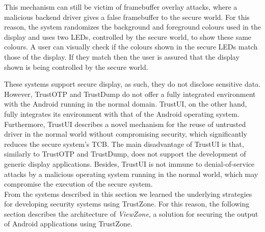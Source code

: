 This mechanism can still be victim of framebuffer overlay attacks, where a malicious backend driver gives a false framebuffer to the secure world. For this reason, the system randomizes the background and foreground colours used in the display and uses two LEDs, controlled by the secure world, to show these same colours. A user can visually check if the colours shown in the secure LEDs match those of the display. If they match then the user is assured that the display shown is being controlled by the secure world.

These systems support secure display, as such, they do not disclose sensitive data. However, TrustOTP and TrustDump do not offer a fully integrated environment with the Android running in the normal domain. TrustUI, on the other hand, fully integrates its environment with that of the Android operating system. Furthermore, TrustUI describes a novel mechanism for the reuse of untrusted driver in the normal world without compromising security, which significantly reduces the secure system's TCB. The main disadvantage of TrustUI is that, similarly to TrustOTP and TrustDump, does not support the development of generic display applications. Besides, TrustUI is not immune to denial-of-service attacks by a malicious operating system running in the normal world, which may compromise the execution of the secure system.\\

From the systems described in this section we learned the underlying strategies for developing security systems using TrustZone. For this reason, the following section describes the architecture of \emph{ViewZone}, a solution for securing the output of Android applications using TrustZone.